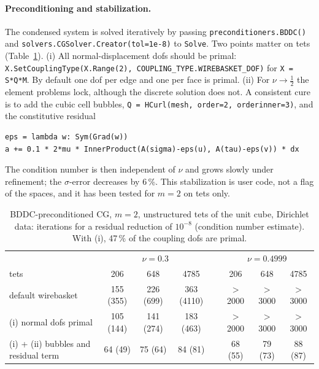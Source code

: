 \documentclass[10pt,a4paper]{article}
\newcommand{\code}[1]{\texttt{#1}}
\begin{document}
\paragraph{Preconditioning and stabilization.}
The condensed system is solved iteratively by passing \code{preconditioners.BDDC()} and \code{solvers.CGSolver.Creator(tol=1e-8)} to \code{Solve}. Two points matter on tets (Table~\ref{tab:bddc}).
(i) All normal-displacement dofs should be primal: \code{X.SetCouplingType(X.Range(2), COUPLING\_TYPE.WIREBASKET\_DOF)} for \code{X = S*Q*M}. By default one dof per edge and one per face is primal.
(ii) For $\nu\to\frac12$ the element problems lock, although the discrete solution does not. A consistent cure is to add the cubic cell bubbles, \code{Q = HCurl(mesh, order=2, orderinner=3)}, and the constitutive residual
\begin{lstlisting}[numbers=none,xleftmargin=0pt]
eps = lambda w: Sym(Grad(w))
a += 0.1 * 2*mu * InnerProduct(A(sigma)-eps(u), A(tau)-eps(v)) * dx
\end{lstlisting}
The condition number is then independent of $\nu$ and grows slowly under refinement; the $\sigma$-error decreases by 6\,\%.
This stabilization is user code, not a flag of the spaces, and it has been tested for $m=2$ on tets only.

\begin{table}[h]\centering\footnotesize\setlength{\tabcolsep}{5pt}
\begin{tabular}{@{}l ccc c ccc@{}}\toprule
 & \multicolumn{3}{c}{$\nu=0.3$} && \multicolumn{3}{c}{$\nu=0.4999$}\\
 tets & 206 & 648 & 4785 && 206 & 648 & 4785\\\midrule
 default wirebasket                    & 155 (355) & 226 (699) & 363 (4110) && $>$2000 & $>$3000 & $>$3000\\
 (i) normal dofs primal                & 105 (144) & 141 (274) & 183 (463) && $>$2000 & $>$3000 & $>$3000\\
 (i) + (ii) bubbles and residual term  & 64 (49) & 75 (64) & 84 (81) && 68 (55) & 79 (73) & 88 (87)\\\bottomrule
\end{tabular}
\caption{BDDC-preconditioned CG, $m=2$, unstructured tets of the unit cube, Dirichlet data: iterations for a residual reduction of $10^{-8}$ (condition number estimate). With (i), 47\,\% of the coupling dofs are primal.}\label{tab:bddc}
\end{table}
\end{document}

